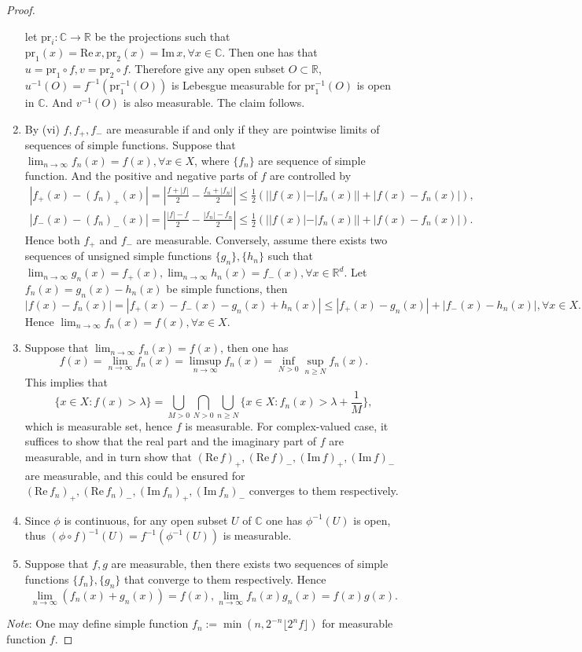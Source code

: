 \documentclass[a4paper]{article}
\renewcommand{\Re}{\mathrm{Re}\,}
\renewcommand{\Im}{\mathrm{Im}\,}
\begin{document}
\begin{proof}
\begin{enumerate}[label = (\roman*)]
    let $\mathrm{pr}_i: \mathbb{C} \to \mathbb{R}$ be the projections such that $\mathrm{pr}_1(x) = \Re x, \mathrm{pr}_2(x)
= \Im x, \forall x \in \mathbb{C}$. Then one has that $u = \mathrm{pr}_1 \circ f, v = \mathrm{pr}_2  \circ f$. Therefore give any 
open subset $O \subset \mathbb{R}$, $u^{-1}(O) = f^{-1}(\mathrm{pr}_1^{-1}(O))$ is Lebesgue measurable for $\mathrm{pr}_1^{-1}(O)$
is open in $\mathbb{C}$. And $v^{-1}(O)$ is also measurable. The claim follows.
    \item By (vi) $f, f_+, f_-$ are measurable if and only if they are pointwise limits of sequences of simple functions.
    Suppose that $\lim_{n \to \infty} f_n(x) = f(x), \forall x \in X$, where $\{f_n\}$ are sequence of simple function.
    And the positive and negative parts of $f$
are controlled by \begin{gather*}
|f_+(x) - (f_n)_+(x)| = |\frac{f + |f|}{2} - \frac{f_n + |f_n|}{2}| \leq \frac{1}{2}(||f(x)| - |f_n(x)||
+ |f(x) - f_n(x)|),\\
|f_-(x) - (f_n)_-(x)| = |\frac{|f| - f}{2} - \frac{|f_n| - f_n}{2}| \leq \frac{1}{2}(||f(x)| - |f_n(x)||
+ |f(x) - f_n(x)|).
\end{gather*}
Hence both $f_+$ and $f_-$ are measurable. Conversely, assume there exists two
sequences of unsigned simple functions $\{g_n\}, \{h_n\}$ such that $\lim_{n \to \infty} g_n(x) = f_+(x), 
\lim_{n \to \infty} h_n(x) = f_-(x), \forall x \in \mathbb{R}^d$. Let $f_n(x) = g_n(x) - h_n(x)$ be simple functions,
then $$
|f(x) - f_n(x)| = |f_+(x) - f_-(x) - g_n(x) + h_n(x)| \leq |f_+(x) - g_n(x)| + |f_-(x) - h_n(x)|, \forall x \in X.
$$Hence $\lim_{n \to \infty} f_n(x) = f(x) ,\forall  x \in X$.
    \item Suppose that $\lim_{n \to \infty} f_n(x) = f(x)$, then one has $$
    f(x) = \lim_{n \to \infty} f_n(x) = \limsup_{n \to \infty} f_n(x) = \inf_{N > 0}\sup_{n \geq N} f_n(x).
    $$This implies that $$
    \{x \in X : f(x) > \lambda\} = \bigcup_{M > 0}\bigcap_{N > 0}\bigcup_{n \geq N}\{x \in X : 
    f_n(x) > \lambda + \frac{1}{M}\},
    $$which is measurable set, hence $f$ is measurable. For complex-valued case, it suffices to show that the real part
    and the imaginary part of $f$ are measurable, and in turn show that $(\Re f)_+, (\Re f)_-, (\Im f)_+, (\Im f)_-$
    are measurable, and this could be ensured for $(\Re f_n)_+, (\Re f_n)_-, (\Im f_n)_+, (\Im f_n)_-$ converges to 
    them respectively.
    \item Since $\phi$ is continuous, for any open subset $U$ of $\mathbb{C}$ one has $\phi^{-1}(U)$ is open, thus 
    $(\phi \circ f)^{-1}(U) = f^{-1}(\phi^{-1}(U))$ is measurable.
    \item Suppose that $f, g$ are measurable, then there exists two sequences of simple functions $\{f_n\}, \{g_n\}$
    that converge to them respectively. Hence \[
        \lim_{n \to \infty} (f_n(x) + g_n(x)) = f(x), \lim_{n \to \infty} f_n(x)g_n(x) = f(x)g(x). \]
\end{enumerate}
\emph{Note}: One may define simple function $f_n := \min(n, 2^{-n}\lfloor 2^n f \rfloor)$ for measurable function $f$.
\end{proof}
\end{document}

